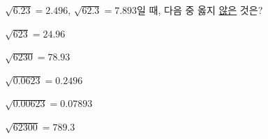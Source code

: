 $\sqrt{6.23}=2.496$, $\sqrt{62.3}=7.893$일 때, 다음 중 옳지 \underline{않은} 것은?
\begin{choicesii}{\rule[-3ex]{0pt}{8ex}$\sqrt{623}=24.96$}{\rule[-3ex]{0pt}{8ex}$\sqrt{6230}=78.93$}{\rule[-3ex]{0pt}{8ex}$\sqrt{0.0623}=0.2496$}{\rule[-3ex]{0pt}{8ex}$\sqrt{0.00623}=0.07893$}{\rule[-3ex]{0pt}{8ex}$\sqrt{62300}=789.3$}\end{choicesii}
